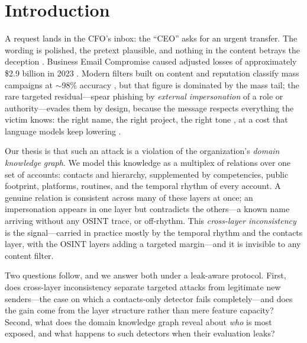 \documentclass[conference]{IEEEtran}
\begin{document}
\section{Introduction}
\label{sec:intro}
A request lands in the CFO's inbox: the ``CEO'' asks for an urgent transfer. The wording is polished, the
pretext plausible, and nothing in the content betrays the deception \cite{butavicius2022why,sturman2025security}.
Business Email Compromise caused adjusted losses of approximately \$2.9 billion in 2023 \cite{fbi2024ic3}.
Modern filters built on content and reputation classify mass campaigns at $\sim$98\% accuracy
\cite{birthriya2025detection,tan2020graph}, but that figure is dominated by the mass tail; the rare targeted
residual---spear phishing by \emph{external impersonation} of a role or authority---evades them by design, because the message respects everything the
victim knows: the right name, the right project, the right tone \cite{dewan2014analyzing}, at a cost
that language models keep lowering \cite{bethany2024evaluating}.

Our thesis is that such an attack is a violation of the organization's \emph{domain knowledge graph}. We model
this knowledge as a multiplex of relations over one set of accounts: contacts and hierarchy, supplemented by
competencies, public footprint, platforms, routines, and the temporal rhythm of every account. A genuine
relation is consistent across many of these layers at once; an impersonation appears in one layer but
contradicts the others---a known name arriving without any OSINT trace, or off-rhythm. This
\emph{cross-layer inconsistency} is the signal---carried in practice mostly by the temporal rhythm and the
contacts layer, with the OSINT layers adding a targeted margin---and it is invisible to any content filter.

Two questions follow, and we answer both under a leak-aware protocol. First, does cross-layer inconsistency
separate targeted attacks from legitimate new senders---the case on which a contacts-only detector fails
completely---and does the gain come from the layer structure rather than mere feature capacity? Second, what does the domain knowledge
graph reveal about \emph{who} is most exposed, and what happens to such detectors when their evaluation leaks?
\end{document}
